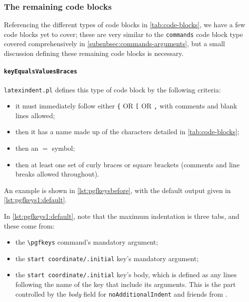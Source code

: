 \subsubsection{The remaining code blocks}
	Referencing the different types of code blocks in \vref{tab:code-blocks}, we have a few
	code blocks yet to cover; these are very similar to the \texttt{commands} code block type
	covered comprehensively in \vref{subsubsec:commands-arguments}, but a small discussion
	defining these remaining code blocks is necessary.

	\paragraph{\texttt{keyEqualsValuesBraces}}
		\texttt{latexindent.pl} defines this type of code block by the following criteria:
		\begin{itemize}
			\item it must immediately follow either \lstinline!{! OR \lstinline![! OR \lstinline!,! with comments
			      and blank lines allowed;
			\item then it has a name made up of the characters detailed in \vref{tab:code-blocks};
			\item then an $=$ symbol;
			\item then at least one set of curly braces or square brackets (comments and line breaks allowed throughout).
		\end{itemize}

		An example is shown in \cref{lst:pgfkeysbefore}, with the default output given in \cref{lst:pgfkeys1:default}.

		\begin{minipage}{.45\textwidth}
		\end{minipage}%
		\hfill
		\begin{minipage}{.5\textwidth}
		\end{minipage}%

		In \cref{lst:pgfkeys1:default}, note that the maximum indentation is three tabs, and these come from:
		\begin{itemize}
			\item the \lstinline!\pgfkeys! command's mandatory argument;
			\item the \lstinline!start coordinate/.initial! key's mandatory argument;
			\item the \lstinline!start coordinate/.initial! key's body, which is defined as any lines following the name of the
			      key that include its arguments.  This is the part controlled by the \emph{body} field for \texttt{noAdditionalIndent}
			      and friends from .
		\end{itemize}
